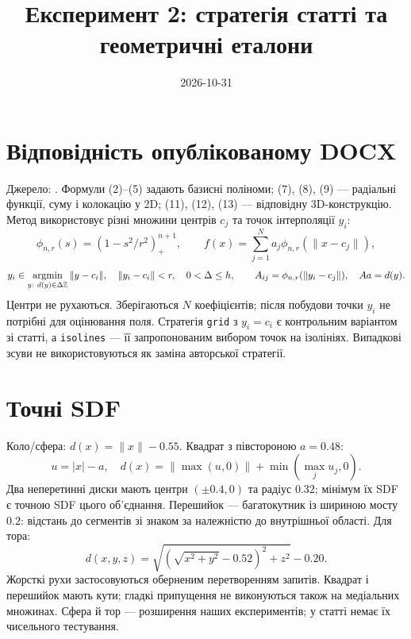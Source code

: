 \documentclass[11pt,a4paper]{article}
\begin{document}
\title{Експеримент 2: стратегія статті та геометричні еталони}\author{}\date{2026-10-31}\maketitle

\section*{Відповідність опублікованому DOCX}
Джерело: .
Формули (2)--(5) задають базисні поліноми; (7), (8), (9) ---
радіальні функції, суму і колокацію у 2D; (11), (12), (13) --- відповідну
3D-конструкцію. Метод використовує різні множини центрів $c_j$
та точок інтерполяції $y_i$:
\[
 \phi_{n,r}(s)=(1-s^2/r^2)_+^{n+1},\qquad
 f(x)=\sum_{j=1}^N a_j\phi_{n,r}(\|x-c_j\|),
\]
\[
 y_i\in\mathop{\rm argmin}_{y:\ d(y)\in\Delta\mathbb Z}\|y-c_i\|,
 \quad \|y_i-c_i\|<r,\quad 0<\Delta\le h,
 \qquad A_{ij}=\phi_{n,r}(\|y_i-c_j\|),\quad Aa=d(y).
\]
Центри не рухаються. Зберігаються $N$ коефіцієнтів; після побудови
точки $y_i$ не потрібні для оцінювання поля.
Стратегія \texttt{grid} з $y_i=c_i$ є контрольним варіантом зі статті,
а \texttt{isolines} --- її запропонованим вибором точок на ізолініях.
Випадкові зсуви не використовуються як заміна авторської стратегії.

\section*{Точні SDF}
Коло/сфера: $d(x)=\|x\|-0.55$. Квадрат з півстороною $a=0.48$:
\[
 u=|x|-a,\quad d(x)=\|\max(u,0)\|+\min(\max_j u_j,0).
\]
Два неперетинні диски мають центри $(\pm0.4,0)$ та радіус $0.32$;
мінімум їх SDF є точною SDF цього об'єднання. Перешийок ---
багатокутник із шириною мосту $0.2$: відстань до сегментів зі знаком
за належністю до внутрішньої області. Для тора:
\[
 d(x,y,z)=\sqrt{(\sqrt{x^2+y^2}-0.52)^2+z^2}-0.20.
\]
Жорсткі рухи застосовуються оберненим перетворенням запитів.
Квадрат і перешийок мають кути; гладкі припущення не виконуються
також на медіальних множинах. Сфера й тор --- розширення наших
експериментів; у статті немає їх чисельного тестування.
\end{document}
